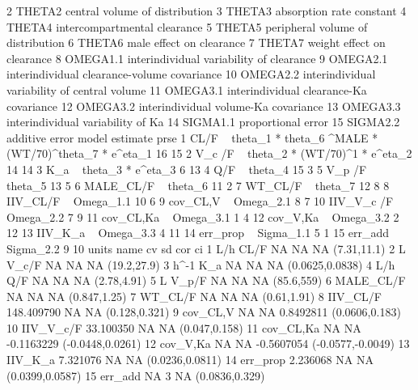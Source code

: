 \begin{Schunk}
\begin{Soutput}
2     THETA2                central volume of distribution
3     THETA3                      absorption rate constant
4     THETA4                  intercompartmental clearance
5     THETA5             peripheral volume of distribution
6     THETA6                      male effect on clearance
7     THETA7                    weight effect on clearance
8   OMEGA1.1      interindividual variability of clearance
9   OMEGA2.1   interindividual clearance-volume covariance
10  OMEGA2.2 interindividual variability of central volume
11  OMEGA3.1       interindividual clearance-Ka covariance
12  OMEGA3.2          interindividual volume-Ka covariance
13  OMEGA3.3             interindividual variability of Ka
14  SIGMA1.1                            proportional error
15  SIGMA2.2                                additive error
                                                           model estimate prse
1  CL/F  ~ theta_1 *  theta_6 ^MALE * (WT/70)^theta_7  * e^eta_1       16   15
2                        V_c /F  ~ theta_2 * (WT/70)^1 * e^eta_2       14   14
3                                       K_a  ~ theta_3 * e^eta_3        6   13
4                                                 Q/F  ~ theta_4       15    3
5                                              V_p /F  ~ theta_5       13    5
6                                            MALE_CL/F ~ theta_6       11    2
7                                              WT_CL/F ~ theta_7       12    8
8                                           IIV_CL/F ~ Omega_1.1       10    6
9                                           cov_CL,V ~ Omega_2.1        8    7
10                                        IIV_V_c /F ~ Omega_2.2        7    9
11                                        cov_CL,Ka  ~ Omega_3.1        1    4
12                                         cov_V,Ka  ~ Omega_3.2        2   12
13                                          IIV_K_a  ~ Omega_3.3        4   11
14                                          err_prop ~ Sigma_1.1        5    1
15                                           err_add ~ Sigma_2.2        9   10
   units      name         cv sd        cor                ci
1    L/h      CL/F         NA NA         NA       (7.31,11.1)
2      L     V_c/F         NA NA         NA       (19.2,27.9)
3  h^-1        K_a         NA NA         NA   (0.0625,0.0838)
4    L/h       Q/F         NA NA         NA       (2.78,4.91)
5      L     V_p/F         NA NA         NA        (85.6,559)
6        MALE_CL/F         NA NA         NA      (0.847,1.25)
7          WT_CL/F         NA NA         NA       (0.61,1.91)
8         IIV_CL/F 148.409790 NA         NA     (0.128,0.321)
9         cov_CL,V         NA NA  0.8492811    (0.0606,0.183)
10       IIV_V_c/F  33.100350 NA         NA     (0.047,0.158)
11       cov_CL,Ka         NA NA -0.1163229  (-0.0448,0.0261)
12        cov_V,Ka         NA NA -0.5607054 (-0.0577,-0.0049)
13         IIV_K_a   7.321076 NA         NA   (0.0236,0.0811)
14        err_prop   2.236068 NA         NA   (0.0399,0.0587)
15         err_add         NA  3         NA    (0.0836,0.329)
\end{Soutput}
\end{Schunk}
